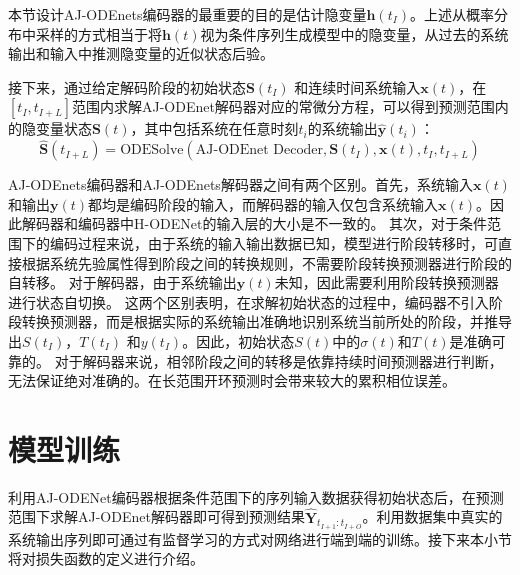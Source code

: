 本节设计AJ-ODEnets编码器的最重要的目的是估计隐变量$\boldsymbol h(t_I)$。上述从概率分布中采样的方式相当于将$\boldsymbol h(t)$视为条件序列生成模型中的隐变量，从过去的系统输出和输入中推测隐变量的近似状态后验\cite{10.5555/3454287.3454765,Hafner2019}。

接下来，通过给定解码阶段的初始状态$\boldsymbol S(t_I)$ 和连续时间系统输入$\boldsymbol x(t)$，在$[t_I, t_{I+L}]$范围内求解AJ-ODEnet解码器对应的常微分方程，可以得到预测范围内的隐变量状态$\boldsymbol S(t)$，其中包括系统在任意时刻$t_i$的系统输出$\boldsymbol{\hat{y}}(t_i)$：
\begin{equation}
\boldsymbol {\hat S}(t_{I+L})=\text{ODESolve}(\text{AJ-ODEnet Decoder},\boldsymbol S(t_I)
, \boldsymbol {x}(t), t_I, t_{I+L})
\label{equ:decoding}
\end{equation}



AJ-ODEnets编码器和AJ-ODEnets解码器之间有两个区别。首先，系统输入$\boldsymbol x(t)$和输出$\boldsymbol y(t)$都均是编码阶段的输入，而解码器的输入仅包含系统输入$\boldsymbol x(t)$。因此解码器和编码器中H-ODENet的输入层的大小是不一致的。
其次，对于条件范围下的编码过程来说，由于系统的输入输出数据已知，模型进行阶段转移时，可直接根据系统先验属性得到阶段之间的转换规则，不需要阶段转换预测器进行阶段的自转移。
对于解码器，由于系统输出$\boldsymbol y(t)$未知，因此需要利用阶段转换预测器进行状态自切换。
这两个区别表明，在求解初始状态的过程中，编码器不引入阶段转换预测器，而是根据实际的系统输出准确地识别系统当前所处的阶段，并推导出$S(t_I)$，$T(t_I)$ 和$y(t_I)$。因此，初始状态$S(t)$中的$\sigma(t)$和$T(t)$是准确可靠的。
对于解码器来说，相邻阶段之间的转移是依靠持续时间预测器进行判断，无法保证绝对准确的。在长范围开环预测时会带来较大的累积相位误差。
\section{模型训练}
\label{sec:loss_function}
利用AJ-ODENet编码器根据条件范围下的序列输入数据获得初始状态后，在预测范围下求解AJ-ODEnet解码器即可得到预测结果$\hat{\boldsymbol{Y}}_{t_{I+1}: t_{I+O}}$。利用数据集中真实的系统输出序列即可通过有监督学习的方式对网络进行端到端的训练。接下来本小节将对损失函数的定义进行介绍。

